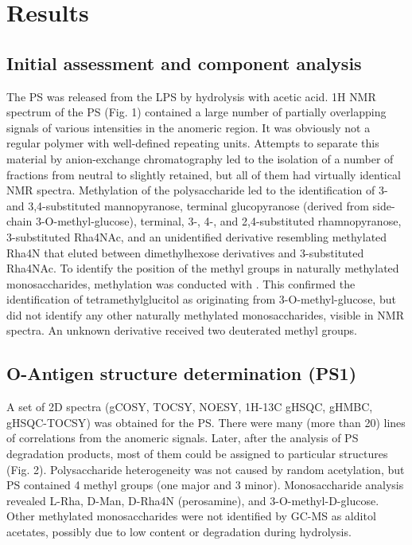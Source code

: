 \section{Results} %
\label{sec:results}

	\subsection{Initial assessment and component analysis} %
	\label{sub:initial_assessment_and_component_analysis}

		The \ac{PS} was released from the \ac{LPS} by hydrolysis with acetic acid. 1H \ac{NMR} spectrum of the \ac{PS} (Fig. 1) contained a large number of partially overlapping signals of various intensities in the anomeric region. It was obviously not a regular polymer with well-defined repeating units. Attempts to separate this material by anion-exchange chromatography led to the isolation of a number of fractions from neutral to slightly retained, but all of them had virtually identical \ac{NMR} spectra. Methylation of the polysaccharide led to the identification of 3- and 3,4-substituted mannopyranose, terminal glucopyranose (derived from side-chain 3-O-methyl-glucose), terminal, 3-, 4-, and 2,4-substituted rhamnopyranose, 3-substituted Rha4NAc, and an unidentified derivative resembling methylated Rha4N that eluted between dimethylhexose derivatives and 3-substituted Rha4NAc. To identify the position of the methyl groups in naturally methylated monosaccharides, methylation was conducted with . This confirmed the identification of tetramethylglucitol as originating from 3-O-methyl-glucose, but did not identify any other naturally methylated monosaccharides, visible in \ac{NMR} spectra. An unknown derivative received two deuterated methyl groups.

	\subsection{O-Antigen structure determination (PS1)} %
	\label{sub:o_antigen_structure_determination_ps1_}

		A set of 2D spectra (\ac{gCOSY}, \ac{TOCSY}, \ac{NOESY}, 1H-13C \ac{gHSQC}, \ac{gHMBC}, \ac{gHSQC}-\ac{TOCSY}) was obtained for the \ac{PS}. There were many (more than 20) lines of correlations from the anomeric signals. Later, after the analysis of \ac{PS} degradation products, most of them could be assigned to particular structures (Fig. 2). Polysaccharide heterogeneity was not caused by random acetylation, but \ac{PS} contained 4 methyl groups (one major and 3 minor). Monosaccharide analysis revealed L-Rha, D-Man, D-Rha4N (perosamine), and 3-O-methyl-D-glucose. Other methylated monosaccharides were not identified by GC-MS as alditol acetates, possibly due to low content or degradation during hydrolysis.


